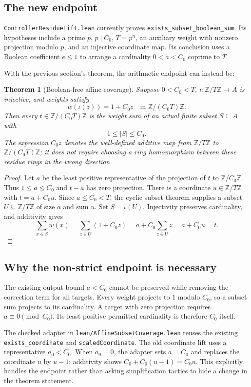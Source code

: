 \documentclass[11pt,letterpaper]{article}
\newtheorem{theorem}{Theorem}[section]
\newcommand{\Z}{\mathbb Z}
\newcommand{\Zm}[1]{\Z/#1\Z}
\newcommand{\card}[1]{\lvert #1\rvert}
\newcommand{\repobase}{https://github.com/VladimirReshetnikov/ProveIt/blob/9f35798db4a63c25e435fca14d75931144657d7e}
\newcommand{\leanfile}[1]{\href{\repobase/Computability/DiophantineConsistency/Lean/DiophantineConsistency/#1.lean}{\nolinkurl{#1.lean}}}
\newcommand{\ident}[1]{\nolinkurl{#1}}
\newcommand{\artifact}[1]{\nolinkurl{#1}}
\begin{document}
\subsection{The new endpoint}

\leanfile{ControllerResidueLift} currently proves
\ident{exists_subset_boolean_sum}. Its hypotheses include a prime $p$,
$p\mid C_0$, $T=p^n$, an auxiliary weight with nonzero projection modulo
$p$, and an injective coordinate map. Its conclusion uses a Boolean
coefficient $e\le1$ to arrange a cardinality $0<a<C_0$ coprime to $T$.

With the previous section's theorem, the arithmetic endpoint can instead be:

\begin{theorem}[Boolean-free affine coverage]
Suppose $0<C_0<T$, $\iota:\Zm T\to A$ is injective, and weights satisfy
\[
 w(\iota(z))=1+C_0z\quad\text{in }\Zm{(C_0T)}.
\]
Then every $t\in\Zm{(C_0T)}$ is the weight sum of an actual finite subset
$S\subseteq A$ with
\[
 1\le\card S\le C_0.
\]
The expression $C_0z$ denotes the well-defined additive map from $\Zm T$
to $\Zm{(C_0T)}$; it does not require choosing a ring homomorphism between
these residue rings in the wrong direction.
\end{theorem}

\begin{proof}
Let $a$ be the least positive representative of the projection of $t$ to
$\Zm{C_0}$. Thus $1\le a\le C_0$ and $t-a$ has zero projection. There
is a coordinate $u\in\Zm T$ with $t=a+C_0u$. Since $a\le C_0<T$,
the cyclic subset theorem supplies a subset $U\subseteq\Zm T$ of size
$a$ and sum $u$. Set $S=\iota(U)$. Injectivity preserves cardinality, and
additivity gives
\[
 \sum_{x\in S}w(x)=\sum_{z\in U}(1+C_0z)
 =a+C_0\sum_{z\in U}z=a+C_0u=t.
\]
\end{proof}

\subsection{Why the non-strict endpoint is necessary}

The existing output bound $a<C_0$ cannot be preserved while removing the
correction term for all targets. Every weight projects to $1$ modulo $C_0$,
so a subset sum projects to its cardinality. A target with zero projection
requires $a\equiv0\pmod{C_0}$. Its least positive permitted cardinality is
therefore $C_0$ itself.

The checked adapter in \artifact{lean/AffineSubsetCoverage.lean} reuses the
existing \ident{exists_coordinate} and \ident{scaledCoordinate}. The old
coordinate lift uses a representative $a_0<C_0$. When $a_0=0$, the adapter
sets $a=C_0$ and replaces the coordinate $u$ by $u-1$; additivity shows
$C_0+C_0(u-1)=C_0u$. This explicitly handles the endpoint rather than
asking simplification tactics to hide a change in the theorem statement.
\end{document}
